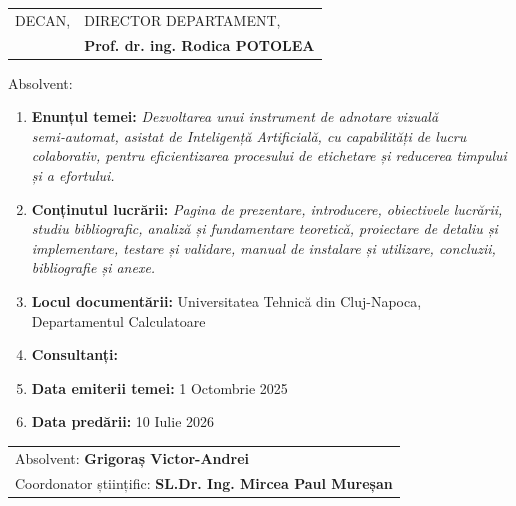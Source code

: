 \begin{tabular}{p{7cm}p{8cm}}
	\hspace{-1cm}DECAN, & DIRECTOR DEPARTAMENT,\\
	\hspace{-1cm}{\bf Prof. dr. ing. Vlad MUREȘAN} & {\bf Prof. dr. ing. Rodica POTOLEA}\\  
\end{tabular}

\vspace{2cm}

\begin{center}
	Absolvent: {\bf \thesisauthor}
	
	\vspace{1cm}
	
	{\bf \thesistitle}
\end{center}

\vspace{5mm}
\begin{enumerate}
	\item {\bf Enunțul temei:} {\it Dezvoltarea unui instrument de adnotare vizuală semi‑automat, asistat de Inteligență Artificială, cu capabilități de lucru colaborativ, pentru eficientizarea procesului de etichetare și reducerea timpului și a efortului.	}
	\item {\bf Conținutul lucrării:} {\it Pagina de prezentare, introducere, obiectivele lucrării, studiu bibliografic, analiză și fundamentare teoretică, proiectare de detaliu și implementare, testare și validare, manual de instalare și utilizare, concluzii, bibliografie și anexe.}
	\item {\bf Locul documentării:} Universitatea Tehnică din Cluj-Napoca, Departamentul Calculatoare
	\item {\bf Consultanți:}
	\item {\bf Data emiterii temei:} 1 Octombrie 2025 %
	\item {\bf Data predării:} 10 Iulie 2026 %
\end{enumerate}
\vspace{1.2cm}

\begin{flushright}
\begin{tabular}{@{}l@{}}
Absolvent: \textbf{Grigoraș Victor-Andrei}\\[4cm]
Coordonator științific: \textbf{SL.Dr. Ing. Mircea Paul Mureșan}
\end{tabular}
\end{flushright}

